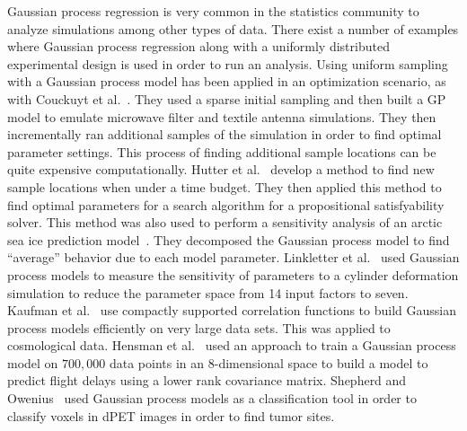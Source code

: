 Gaussian process regression is very common in the statistics community
to analyze simulations among other types of data.
There exist a number of examples where Gaussian process regression along
with a uniformly distributed experimental design is used in order to 
run an analysis.
Using uniform sampling with a Gaussian process model 
has been applied in 
an optimization scenario, as with
Couckuyt et al.~\cite{Couckuyt:2010}.  They used a sparse initial sampling
and then built a GP model to emulate microwave filter and textile antenna
simulations.  They then incrementally ran additional samples of the simulation
in order to find optimal parameter settings.  This process of finding 
additional sample locations can be quite expensive computationally.
Hutter et al.~\cite{Hutter:2010}
develop a method to find new sample locations when under a time budget.
They then applied this method to find optimal parameters for a search
algorithm for a propositional satisfyability solver.
This method was also used to perform
a sensitivity analysis of an arctic sea ice
prediction model~\cite{Chapman:1994}.  They decomposed the Gaussian process
model to find ``average'' behavior due to each model parameter.
Linkletter et al.~\cite{Linkletter:2006} 
used Gaussian process models to measure the sensitivity of parameters to
a cylinder deformation simulation to reduce the parameter space from 14 input 
factors to seven.
Kaufman et al.~\cite{Kaufman:2011} use compactly supported correlation 
functions to build Gaussian process models efficiently on
very large data sets.  This was applied to cosmological data.
Hensman et al.~\cite{Hensman:2013} used an approach to train 
a Gaussian process model on $700,000$ data points in an $8$-dimensional space
to build a model to predict flight delays using a lower rank covariance
matrix.
Shepherd and Owenius~\cite{Shepherd:2012} used Gaussian process models 
as a classification tool in order to classify voxels in dPET images in order
to find tumor sites.

